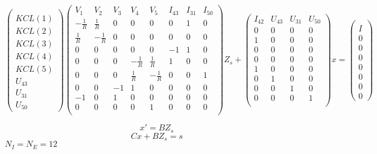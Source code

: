 \[\left(\begin{array}{c}
\\KCL(1)\\KCL(2)\\KCL(3)\\KCL(4)\\KCL(5)\\U_{43}\\U_{31}\\U_{50}
\end{array}\right)
\left(\begin{array}{cccccccc}
  V_{1}&V_{2}&V_{3}&V_{4}&V_{5}&I_{43}&I_{31}&I_{50}\\
  \hline
  -\frac{1}{R}&\frac{1}{R}&0&0&0&0&1&0\\
  \frac{1}{R}&-\frac{1}{R}&0&0&0&0&0&0\\
  0&0&0&0&0&-1&1&0\\
  0&0&0&-\frac{1}{R}&\frac{1}{R}&1&0&0\\
  0&0&0&\frac{1}{R}&-\frac{1}{R}&0&0&1\\
  0&0&-1&1&0&0&0&0\\
  -1&0&1&0&0&0&0&0\\
  0&0&0&0&1&0&0&0\\
\end{array}\right)Z_{s}+
\left(\begin{array}{cccc}
  I_{42}&U_{43}&U_{31}&U_{50}\\
  \hline
  0&0&0&0\\
  1&0&0&0\\
  0&0&0&0\\
  0&0&0&0\\
  1&0&0&0\\
  0&1&0&0\\
  0&0&1&0\\
  0&0&0&1\\
\end{array}\right)x=
\left(\begin{array}{c}
  \\ I\\  0\\  0\\  0\\  0\\  0\\  0\\  0
  \end{array}\right)
\]

\[x'=BZ_{s}\]
\[Cx+BZ_{s}=s\]
$N_{I}=N_{E}=12$
